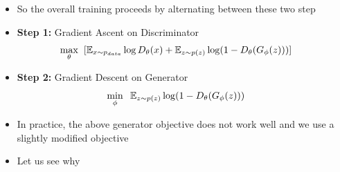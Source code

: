 \begin{frame}
	\begin{columns}
		\begin{overlayarea}{\textwidth}{\textheight}
			\vspace*{10mm}
			\begin{center}
						
			\end{center}		
		\end{overlayarea}

		\begin{overlayarea}{\textwidth}{\textheight}
		
			\begin{itemize}[<+->]
			\item So the overall training proceeds by alternating between these two step
			
			\item \textbf{Step 1:} Gradient Ascent on Discriminator 
				$$ \max\limits_{\theta}\hspace*{2mm} [\mathbb{E}_{x \sim p_{data}} \log D_{\theta}(x)
                \newline
                + \mathbb{E}_{z \sim p(z)} \log(1- D_{\theta}(G_{\phi}(z)) ) ]$$

			\item \textbf{Step 2:} Gradient Descent on Generator
				$$   \min\limits_{\phi}\hspace*{2mm} \mathbb{E}_{z \sim p(z)} \log(1- D_{\theta}(G_{\phi}(z)) )$$
			
			\item In practice, the above generator objective does not work well and we use a slightly modified objective
			\item Let us see why
			\end{itemize}
		\end{overlayarea}
	\end{columns}
\end{frame}


